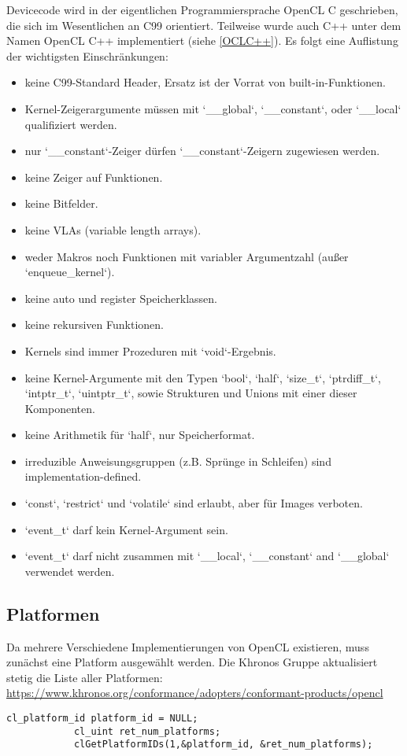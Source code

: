 		Devicecode wird in der eigentlichen Programmiersprache OpenCL C geschrieben, die sich im Wesentlichen an C99 orientiert. Teilweise wurde auch C++ unter dem Namen OpenCL C++ implementiert (siehe \ref{OCLC++}). Es folgt eine Auflistung der wichtigsten Einschränkungen:
		\begin{itemize}
		\item keine C99-Standard Header, Ersatz ist der Vorrat von built-in-Funktionen.
		\item Kernel-Zeigerargumente müssen mit \li`__global`, \li`__constant`, oder \li`__local` qualifiziert werden.  
		\item nur \li`__constant`-Zeiger dürfen \li`__constant`-Zeigern zugewiesen werden.
		\item keine Zeiger auf Funktionen.
		\item keine Bitfelder.
		\item keine VLAs (variable length arrays).
		\item weder Makros noch Funktionen mit variabler Argumentzahl (außer \li`enqueue_kernel`).
		\item keine auto und register Speicherklassen.
		\item keine rekursiven Funktionen.
		\item \Glspl{Kernel} sind immer Prozeduren mit \li`void`-Ergebnis.
		\item keine \Gls{Kernel}-Argumente mit den Typen \li`bool`, \li`half`, \li`size_t`, \li`ptrdiff_t`, \li`intptr_t`, \li`uintptr_t`, sowie Strukturen und Unions mit einer dieser Komponenten.
		\item keine Arithmetik für \li`half`, nur Speicherformat.
		\item irreduzible Anweisungsgruppen (z.B. Sprünge in Schleifen) sind implementation-defined.
		\item \li`const`, \li`restrict` und \li`volatile` sind erlaubt, aber für Images verboten.
		\item \li`event_t` darf kein \Gls{Kernel}-Argument sein.
		\item  \li`event_t` darf nicht zusammen mit \li`__local`, \li`__constant` and \li`__global` verwendet werden.
		\end{itemize}
		
			\subsection{Platformen}
			Da mehrere Verschiedene Implementierungen von OpenCL existieren, muss zunächst eine \Gls{Platform} ausgewählt werden. Die Khronos Gruppe aktualisiert stetig die Liste aller Platformen: \url{https://www.khronos.org/conformance/adopters/conformant-products/opencl}
			\newpage
			\begin{lstlisting}[caption=~Platformabfrage]
			cl_platform_id platform_id = NULL;
			cl_uint ret_num_platforms;
			clGetPlatformIDs(1,&platform_id, &ret_num_platforms);
			\end{lstlisting}

